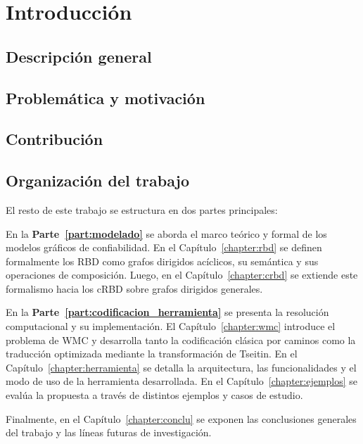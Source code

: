 \chapter{Introducción}
\label{chapter:intro}

\section{Descripción general}
\label{sec:intro_descripcion}

\section{Problemática y motivación}
\label{sec:intro_problematica}

\section{Contribución}
\label{sec:intro_contribucion}

\section{Organización del trabajo}
\label{sec:intro_overview}

El resto de este trabajo se estructura en dos partes principales:

En la \textbf{Parte~\ref{part:modelado}} se aborda el marco teórico y formal de los modelos gráficos de confiabilidad. En el Capítulo~\ref{chapter:rbd} se definen formalmente los \gls{RBD} como grafos dirigidos acíclicos, su semántica y sus operaciones de composición. Luego, en el Capítulo~\ref{chapter:crbd} se extiende este formalismo hacia los \gls{cRBD} sobre grafos dirigidos generales.

En la \textbf{Parte~\ref{part:codificacion_herramienta}} se presenta la resolución computacional y su implementación. El Capítulo~\ref{chapter:wmc} introduce el problema de \gls{WMC} y desarrolla tanto la codificación clásica por caminos como la traducción optimizada mediante la transformación de Tseitin. En el Capítulo~\ref{chapter:herramienta} se detalla la arquitectura, las funcionalidades y el modo de uso de la herramienta desarrollada. En el Capítulo~\ref{chapter:ejemplos} se evalúa la propuesta a través de distintos ejemplos y casos de estudio.

Finalmente, en el Capítulo~\ref{chapter:conclu} se exponen las conclusiones generales del trabajo y las líneas futuras de investigación.